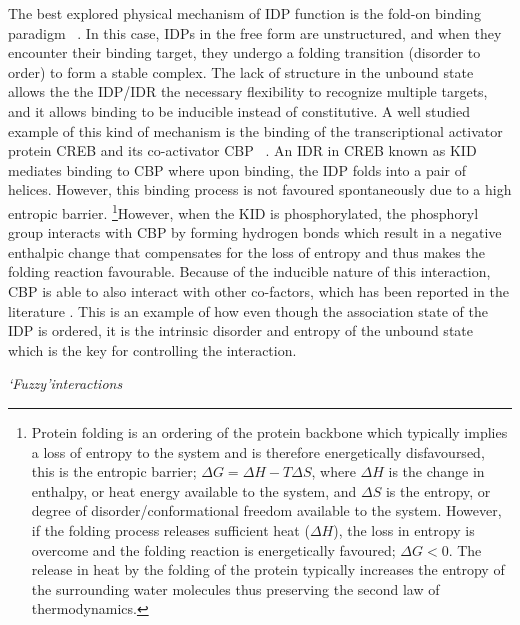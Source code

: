 The best explored physical mechanism of IDP function is the fold-on binding paradigm ~\cite{wright2009linking}. In this case, IDPs in the free form are unstructured, and when they encounter their binding target, they undergo a folding transition (disorder to order) to form a stable complex. The lack of structure in the unbound state allows the the IDP/IDR the necessary flexibility to recognize multiple targets, and it allows binding to be inducible instead of constitutive. A well studied example of this kind of mechanism is the binding of the transcriptional activator protein CREB and its co-activator CBP ~\cite{gianni2012folding}. An IDR in CREB known as KID mediates binding to CBP where upon binding, the IDP folds into a pair of helices. However, this binding process is not favoured spontaneously due to a high entropic barrier. \footnote{Protein folding is an ordering of the protein backbone which typically implies a loss of entropy to the system and is therefore energetically disfavoursed, this is the entropic barrier; $\Delta G = \Delta H - T\Delta S$, where $\Delta H$ is the change in enthalpy, or heat energy available to the system, and $\Delta S$ is the entropy, or degree of disorder/conformational freedom available to the system. However, if the folding process releases sufficient heat ($\Delta H$), the loss in entropy is overcome and the folding reaction is energetically favoured; $\Delta G < 0$. The release in heat by the folding of the protein typically increases the entropy of the surrounding water molecules thus preserving the second law of thermodynamics.}However, when the KID is phosphorylated, the phosphoryl group interacts with CBP by forming hydrogen bonds which result in a negative enthalpic change that compensates for the loss of entropy and thus makes the folding reaction favourable. Because of the inducible nature of this interaction, CBP is able to also interact with other co-factors, which has been reported in the literature \cite{radhakrishnan1997solution}. This is an example of how even though the association state of the IDP is ordered, it is  the intrinsic disorder and entropy of the unbound state which is the key for controlling the interaction. \\


\pagebreak

{\it \lq Fuzzy\rq interactions}

